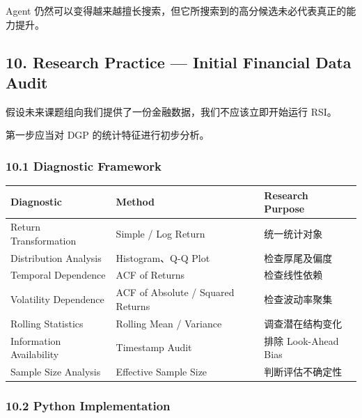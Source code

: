 Agent 仍然可以变得越来越擅长搜索，但它所搜索到的高分候选未必代表真正的能力提升。

\hypertarget{part-4-58-0007-research-practice-initial-financial-data-audit}{%
\subsection{10. Research Practice --- Initial Financial Data Audit}\label{part-4-58-0007-research-practice-initial-financial-data-audit}}

假设未来课题组向我们提供了一份金融数据，我们不应该立即开始运行 RSI。

第一步应当对 DGP 的统计特征进行初步分析。

\hypertarget{part-4-58-0007-diagnostic-framework}{%
\subsubsection{10.1 Diagnostic Framework}\label{part-4-58-0007-diagnostic-framework}}

\begin{readertable}
\begin{longtable}[]{@{}
  >{\raggedright\arraybackslash}p{}
  >{\raggedright\arraybackslash}p{}
  >{\raggedright\arraybackslash}p{}@{}}
\toprule
Diagnostic & Method & Research Purpose \\
\midrule
\endhead
Return Transformation & Simple / Log Return & 统一统计对象 \\
Distribution Analysis & Histogram、Q-Q Plot & 检查厚尾及偏度 \\
Temporal Dependence & ACF of Returns & 检查线性依赖 \\
Volatility Dependence & ACF of Absolute / Squared Returns & 检查波动率聚集 \\
Rolling Statistics & Rolling Mean / Variance & 调查潜在结构变化 \\
Information Availability & Timestamp Audit & 排除 Look-Ahead Bias \\
Sample Size Analysis & Effective Sample Size & 判断评估不确定性 \\
\bottomrule
\end{longtable}
\end{readertable}

\hypertarget{part-4-58-0007-python-implementation}{%
\subsubsection{10.2 Python Implementation}\label{part-4-58-0007-python-implementation}}

